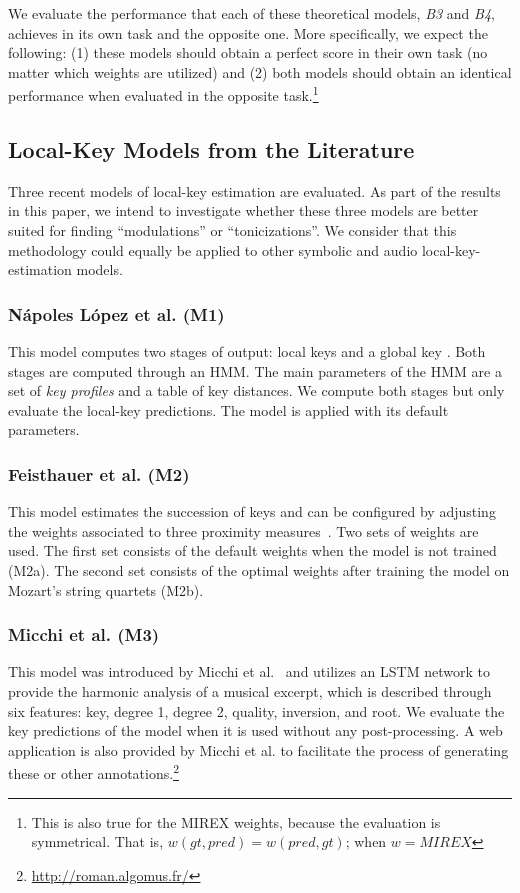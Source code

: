 \documentclass[sigconf]{acmart}
\begin{document}
We evaluate the performance that each of these theoretical models, \emph{B3} and \emph{B4}, achieves in its own task and the opposite one. More specifically, we expect the following: (1) these models should obtain a perfect score in their own task (no matter which weights are utilized) and (2) both models should obtain an identical performance when evaluated in the opposite task.\footnote{This is also true for the MIREX weights, because the evaluation is symmetrical. That is, $w(gt, pred) = w(pred, gt)$; when $w=MIREX$}

\subsection{Local-Key Models from the Literature}
Three recent models of local-key estimation are evaluated. 
As part of the results in this paper, we intend to investigate whether these three models are better suited for finding ``modulations'' or ``tonicizations''. 
We consider that this methodology could equally be applied to other symbolic and audio local-key-estimation models.

\subsubsection{N\'{a}poles L\'opez et al. (M1)}
This model computes two stages of output: local keys and a global key \cite{napoleslopez2019key}. Both stages are computed through an HMM. 
The main parameters of the HMM are a set of \emph{key profiles} and a table of key distances. 
We compute both stages but only evaluate the local-key predictions. 
The model is applied with its default parameters.

\subsubsection{Feisthauer et al. (M2)}
This model estimates the succession of keys and can be configured by adjusting the weights associated to three proximity measures~\cite{feisthauer2020smc}. 
Two sets of weights are used. 
The first set consists of the default weights when the model is not trained (M2a).
The second set consists of the optimal weights after training the model on Mozart's string quartets (M2b). 

\subsubsection{Micchi et al. (M3)}
This model was introduced by Micchi et al.~\cite{micchi20roman} and utilizes an LSTM network to provide the harmonic analysis of a musical excerpt, which is described through six features: key, degree 1, degree 2, quality, inversion, and root. 
We evaluate the key predictions of the model when it is used without any post-processing. 
A web application is also provided by Micchi et al. to facilitate the process of generating these or other annotations.\footnote{ \url{http://roman.algomus.fr/}}
\end{document}
